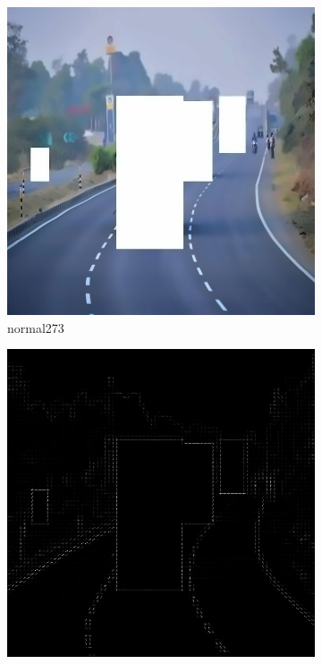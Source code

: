 \documentclass[a4paper, 10pt]{article}
\begin{document}
\begin{figure}[htbp]
		\begin{subfigure}{0.24\textwidth}
			\includegraphics[width=\linewidth]{picture/alldata_filled/normal273}
			\caption{normal273}
			\label{fig: normal273}	
		\end{subfigure}
		\begin{subfigure}{0.24\textwidth}
			\includegraphics[width=\linewidth]{picture/alldata_filled_hog/normal273}

\end{subfigure}
\end{figure}
\end{document}
